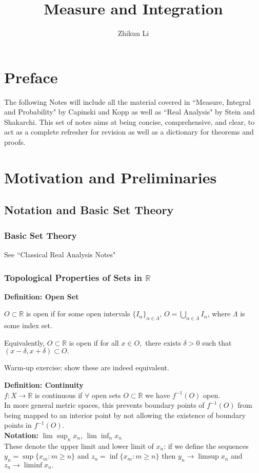 \documentclass{article}
\title{Measure and Integration}
\author{Zhikun Li}
\date{}
\newcommand{\R}{\mathbb{R}}
\newcommand{\0}{{\bf{0}}}
\newcommand{\1}{{\bf{1}}}
\begin{document}
\maketitle
\section*{Preface}
The following Notes will include all the material covered in ``Measure, Integral and Probability" by Capinski and Kopp as well as ``Real Analysis" by Stein and Shakarchi.
This set of notes aims at being concise, comprehensive, and clear, to act as a complete refresher for revision as well as a dictionary for theorems and proofs.
\tableofcontents
\clearpage
\section{Motivation and Preliminaries}
\subsection{Notation and Basic Set Theory}
\subsubsection{Basic Set Theory}
\null\hfill{See ``Classical Real Analysis Notes"}
\subsubsection{Topological Properties of Sets in $\R$}
\textbf{Definition: Open Set}

$O\subset\R$ is open if for some open intervals $\{I_\alpha\}_{\alpha\in\Lambda}$, $O=\displaystyle\bigcup_{\alpha\in\Lambda}I_\alpha$, where $\Lambda$ is some index set.

Equivalently, $O\subset\R$ is open if for all $x \in O,$ there exists $\delta > 0$ such that $(x - \delta, x + \delta) \subset O.$

Warm-up exercise: show these are indeed equivalent.

\textbf{Definition: Continuity}\\
$f:X\to\R$ is continuous if $\forall$ open sets $O\subset \R$ we have $f^{-1}(O)$ open.\\
In more general metric spaces, this prevents boundary points of $f^{-1}(O)$ from being mapped to an interior point by not allowing the existence of boundary points in $f^{-1}(O)$.\\
\textbf{Notation:} $\lim\sup_nx_n$, $\lim\inf_nx_n$\\
These denote the upper limit and lower limit of $x_n$: if we define the sequences $y_n = \sup\{x_m: m \geq n\}$ and $z_n = \inf \{x_m: m \geq n\}$ then $y_n \xrightarrow{} \limsup{x_n}$ and $z_n \xrightarrow{} \liminf{x_n}.$
\end{document}
